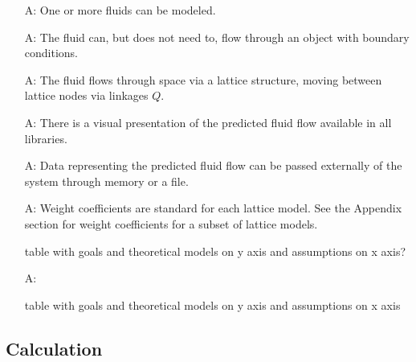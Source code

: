 \documentclass[12pt]{article}
\newcounter{assumpnum} %
\begin{document}
\begin{itemize}

\item[A\refstepcounter{assumpnum}\theassumpnum \label{A_fluids}:]
  One or more fluids can be modeled.
  
\item[A\refstepcounter{assumpnum}\theassumpnum \label{A_flowObject}:]
  The fluid can, but does not need to, flow through an object with boundary conditions.
  
\item[A\refstepcounter{assumpnum}\theassumpnum \label{A_lattice}:]
  The fluid flows through space via a lattice structure, moving between lattice nodes via linkages $Q$.
  
\item[A\refstepcounter{assumpnum}\theassumpnum \label{A_visualPresentation}:]
  There is a visual presentation of the predicted fluid flow available in all libraries.
  
\item[A\refstepcounter{assumpnum}\theassumpnum \label{A_dataPassed}:]
  Data representing the predicted fluid flow can be passed externally of the system through memory or a file.  
  
\item[A\refstepcounter{assumpnum}\theassumpnum \label{A_weightCoefficients}:]
  Weight coefficients are standard for each lattice model. See the Appendix section for weight coefficients for a subset of lattice models.  

 table with goals and theoretical models on y axis and assumptions on x axis?
\item[A\refstepcounter{assumpnum}\theassumpnum \label{A_meaningfulLabel}:]

 table with goals and theoretical models on y axis and assumptions on x axis

\end{itemize}


\subsection{Calculation} \label{sec_Calculation}
\end{document}
